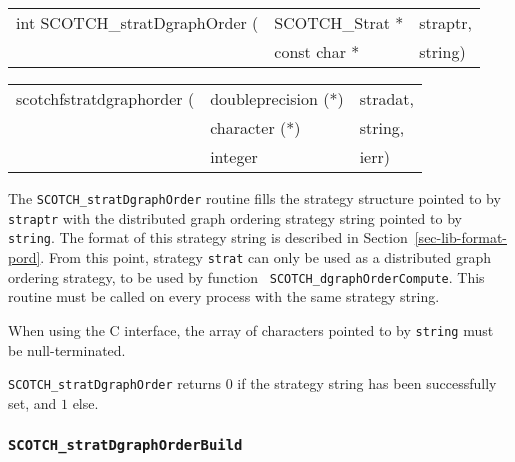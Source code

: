 \begin{itemize}
\progsyn

{\tt\begin{tabular}{l@{}ll}
int SCOTCH\_stratDgraphOrder ( & SCOTCH\_Strat * & straptr, \\
                               & const char *    & string)
\end{tabular}}

{\tt\begin{tabular}{l@{}ll}
scotchfstratdgraphorder ( & doubleprecision (*) & stradat, \\
                          & character (*)       & string,  \\
                          & integer             & ierr)
\end{tabular}}

\progdes

The {\tt SCOTCH\_stratDgraphOrder} routine fills the strategy
structure pointed to by {\tt straptr} with the distributed graph
ordering strategy string pointed to by {\tt string}. The format of
this strategy string is described in Section~\ref{sec-lib-format-pord}.
From this point, strategy {\tt strat} can only be used as a
distributed graph ordering strategy, to be used by function {\tt
SCOTCH\_\lbt dgraph\lbt Order\lbt Compute}. This routine must be
called on every process with the same strategy string.

When using the C interface, the array of characters pointed to by
{\tt string} must be null-terminated.

\progret

{\tt SCOTCH\_stratDgraphOrder} returns $0$ if the strategy string
has been successfully set, and $1$ else.
\end{itemize}

\subsubsection{{\tt SCOTCH\_stratDgraphOrderBuild}}

